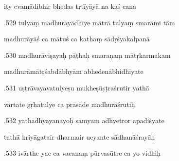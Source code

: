 \documentclass[article,12pt,a4paper]{memoir}%
\newcounter{parCount}
\begin{document}
	  
	  \pstart \leavevmode%
	ity evamādibhir bhedas tṛtīyāyā na kaś cana 
	{}
	\pend%
      

	  
	  \pstart {}.529 tulyaṃ madhurayādhīye mātrā tulyaṃ smarāmi tām 
	{}
	\pend%
      

	  
	  \pstart \leavevmode%
	madhurāyāś ca mātuś ca kathaṃ sādṛśyakalpanā 
	{}
	\pend%
      

	  
	  \pstart {}.530 madhurāviṣayaḥ pāṭhaḥ smaraṇaṃ mātṛkarmakam 
	{}
	\pend%
      

	  
	  \pstart \leavevmode%
	madhurāmātṛśabdābhyām abhedenābhidhīyate 
	{}
	\pend%
      

	  
	  \pstart {}.531 uṣṭrāvayavatulyeṣu mukheṣūṣṭraśrutir yathā 
	{}
	\pend%
      

	  
	  \pstart \leavevmode%
	vartate gṛhatulye ca prāsāde madhurāśrutiḥ 
	{}
	\pend%
      

	  
	  \pstart {}.532 yathādhyayanayoḥ sāmyam adhyetror apadiśyate 
	{}
	\pend%
      

	  
	  \pstart \leavevmode%
	tathā kriyāgatair dharmair ucyante sādhanāśrayāḥ 
	{}
	\pend%
      

	  
	  \pstart {}.533 ivārthe yac ca vacanaṃ pūrvasūtre ca yo vidhiḥ 
	{}
	\pend%
      
\end{document}
